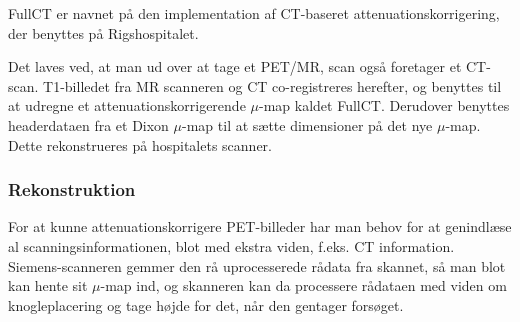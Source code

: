 FullCT er navnet på den implementation af CT-baseret
attenuationskorrigering, der benyttes på Rigshospitalet.

Det laves ved, at man ud over at tage et PET/MR, scan også foretager et CT-scan. T1-billedet fra MR scanneren og CT co-registreres herefter, og
benyttes til at udregne et attenuationskorrigerende $\mu$-map kaldet
FullCT. Derudover benyttes headerdataen fra et Dixon $\mu$-map til
at sætte dimensioner på det nye $\mu$-map. Dette rekonstrueres på
hospitalets scanner.

\subsubsection{Rekonstruktion}

For at kunne attenuationskorrigere PET-billeder har man behov for at
genindlæse al scanningsinformationen, blot med ekstra viden, f.eks.
CT information. Siemens-scanneren gemmer den rå uprocesserede rådata fra
skannet, så man blot kan hente sit $\mu$-map ind, og skanneren kan da
processere rådataen med viden om knogleplacering og tage højde for det,
når den gentager forsøget.

